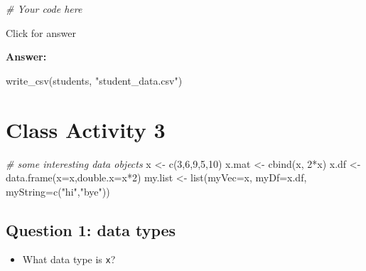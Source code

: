 \documentclass[
]{book}
\newenvironment{Shaded}{\begin{snugshade}}{\end{snugshade}}
\newcommand{\AttributeTok}[1]{\textcolor[rgb]{0.77,0.63,0.00}{#1}}
\newcommand{\CommentTok}[1]{\textcolor[rgb]{0.56,0.35,0.01}{\textit{#1}}}
\newcommand{\DecValTok}[1]{\textcolor[rgb]{0.00,0.00,0.81}{#1}}
\newcommand{\FunctionTok}[1]{\textcolor[rgb]{0.00,0.00,0.00}{#1}}
\newcommand{\NormalTok}[1]{#1}
\newcommand{\OtherTok}[1]{\textcolor[rgb]{0.56,0.35,0.01}{#1}}
\newcommand{\SpecialCharTok}[1]{\textcolor[rgb]{0.00,0.00,0.00}{#1}}
\newcommand{\StringTok}[1]{\textcolor[rgb]{0.31,0.60,0.02}{#1}}
\providecommand{\tightlist}{%
  \setlength{\itemsep}{0pt}\setlength{\parskip}{0pt}}
\begin{document}
\begin{Shaded}
\begin{Highlighting}[]
\CommentTok{\# Your code here}
\end{Highlighting}
\end{Shaded}

Click for answer

\textbf{Answer:}

\begin{Shaded}
\begin{Highlighting}[]
\FunctionTok{write\_csv}\NormalTok{(students, }\StringTok{"student\_data.csv"}\NormalTok{)}
\end{Highlighting}
\end{Shaded}

\hypertarget{class-activity-3}{%
\chapter{Class Activity 3}\label{class-activity-3}}

\begin{Shaded}
\begin{Highlighting}[]
\CommentTok{\# some interesting data objects}
\NormalTok{x }\OtherTok{\textless{}{-}} \FunctionTok{c}\NormalTok{(}\DecValTok{3}\NormalTok{,}\DecValTok{6}\NormalTok{,}\DecValTok{9}\NormalTok{,}\DecValTok{5}\NormalTok{,}\DecValTok{10}\NormalTok{)}
\NormalTok{x.mat }\OtherTok{\textless{}{-}} \FunctionTok{cbind}\NormalTok{(x, }\DecValTok{2}\SpecialCharTok{*}\NormalTok{x)}
\NormalTok{x.df }\OtherTok{\textless{}{-}} \FunctionTok{data.frame}\NormalTok{(}\AttributeTok{x=}\NormalTok{x,}\AttributeTok{double.x=}\NormalTok{x}\SpecialCharTok{*}\DecValTok{2}\NormalTok{)}
\NormalTok{my.list }\OtherTok{\textless{}{-}} \FunctionTok{list}\NormalTok{(}\AttributeTok{myVec=}\NormalTok{x, }\AttributeTok{myDf=}\NormalTok{x.df, }\AttributeTok{myString=}\FunctionTok{c}\NormalTok{(}\StringTok{"hi"}\NormalTok{,}\StringTok{"bye"}\NormalTok{))}
\end{Highlighting}
\end{Shaded}

\hypertarget{question-1-data-types}{%
\section{Question 1: data types}\label{question-1-data-types}}

\begin{itemize}
\tightlist
\item
  What data type is \texttt{x}?
\end{itemize}
\end{document}
